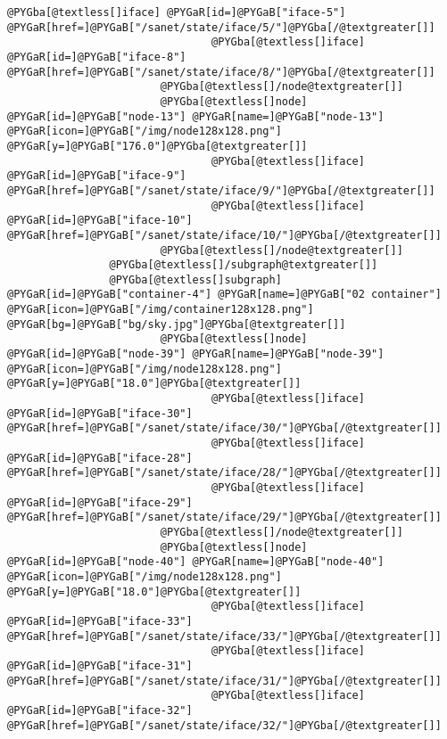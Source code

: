 \documentclass[a4wide,10pt,italian]{manual}
\begin{document}
\begin{Verbatim}[commandchars=@\[\]]
                                @PYGba[@textless[]iface] @PYGaR[id=]@PYGaB["iface-5"] @PYGaR[href=]@PYGaB["/sanet/state/iface/5/"]@PYGba[/@textgreater[]]
                                @PYGba[@textless[]iface] @PYGaR[id=]@PYGaB["iface-8"] @PYGaR[href=]@PYGaB["/sanet/state/iface/8/"]@PYGba[/@textgreater[]]
                        @PYGba[@textless[]/node@textgreater[]]
                        @PYGba[@textless[]node] @PYGaR[id=]@PYGaB["node-13"] @PYGaR[name=]@PYGaB["node-13"] @PYGaR[icon=]@PYGaB["/img/node128x128.png"] @PYGaR[y=]@PYGaB["176.0"]@PYGba[@textgreater[]]
                                @PYGba[@textless[]iface] @PYGaR[id=]@PYGaB["iface-9"] @PYGaR[href=]@PYGaB["/sanet/state/iface/9/"]@PYGba[/@textgreater[]]
                                @PYGba[@textless[]iface] @PYGaR[id=]@PYGaB["iface-10"] @PYGaR[href=]@PYGaB["/sanet/state/iface/10/"]@PYGba[/@textgreater[]]
                        @PYGba[@textless[]/node@textgreater[]]
                @PYGba[@textless[]/subgraph@textgreater[]]
                @PYGba[@textless[]subgraph] @PYGaR[id=]@PYGaB["container-4"] @PYGaR[name=]@PYGaB["02 container"] @PYGaR[icon=]@PYGaB["/img/container128x128.png"] @PYGaR[bg=]@PYGaB["bg/sky.jpg"]@PYGba[@textgreater[]]
                        @PYGba[@textless[]node] @PYGaR[id=]@PYGaB["node-39"] @PYGaR[name=]@PYGaB["node-39"] @PYGaR[icon=]@PYGaB["/img/node128x128.png"] @PYGaR[y=]@PYGaB["18.0"]@PYGba[@textgreater[]]
                                @PYGba[@textless[]iface] @PYGaR[id=]@PYGaB["iface-30"] @PYGaR[href=]@PYGaB["/sanet/state/iface/30/"]@PYGba[/@textgreater[]]
                                @PYGba[@textless[]iface] @PYGaR[id=]@PYGaB["iface-28"] @PYGaR[href=]@PYGaB["/sanet/state/iface/28/"]@PYGba[/@textgreater[]]
                                @PYGba[@textless[]iface] @PYGaR[id=]@PYGaB["iface-29"] @PYGaR[href=]@PYGaB["/sanet/state/iface/29/"]@PYGba[/@textgreater[]]
                        @PYGba[@textless[]/node@textgreater[]]
                        @PYGba[@textless[]node] @PYGaR[id=]@PYGaB["node-40"] @PYGaR[name=]@PYGaB["node-40"] @PYGaR[icon=]@PYGaB["/img/node128x128.png"] @PYGaR[y=]@PYGaB["18.0"]@PYGba[@textgreater[]]
                                @PYGba[@textless[]iface] @PYGaR[id=]@PYGaB["iface-33"] @PYGaR[href=]@PYGaB["/sanet/state/iface/33/"]@PYGba[/@textgreater[]]
                                @PYGba[@textless[]iface] @PYGaR[id=]@PYGaB["iface-31"] @PYGaR[href=]@PYGaB["/sanet/state/iface/31/"]@PYGba[/@textgreater[]]
                                @PYGba[@textless[]iface] @PYGaR[id=]@PYGaB["iface-32"] @PYGaR[href=]@PYGaB["/sanet/state/iface/32/"]@PYGba[/@textgreater[]]

\end{Verbatim}
\end{document}

